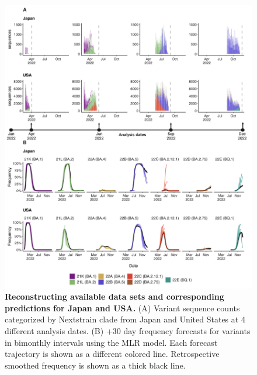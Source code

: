 \documentclass[11pt,oneside,letterpaper]{article}
\begin{document}
\begin{figure}[tb!]
	\centering
	\includegraphics[width=0.95\textwidth=0.01]{figures/dynamic_est_env.png}
	\caption{
		\textbf{Reconstructing available data sets and corresponding predictions for Japan and USA.}
		(A) Variant sequence counts categorized by Nextstrain clade from Japan and United States at 4 different analysis dates.
		(B) +30 day frequency forecasts for variants in bimonthly intervals using the MLR model.
		Each forecast trajectory is shown as a different colored line.
		Retrospective smoothed frequency is shown as a thick black line.
	}
	\label{fig:dynamic_forecast_env}
\end{figure}
\end{document}
